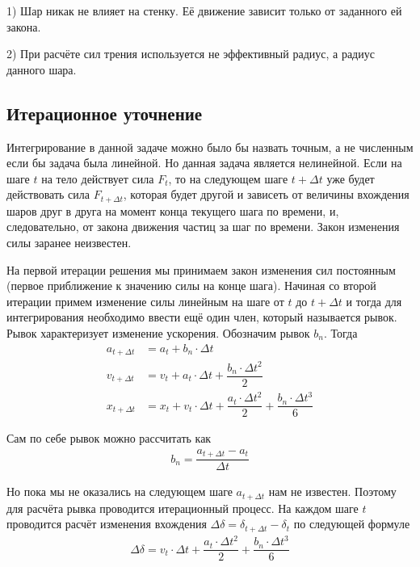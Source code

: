 \documentclass[a4paper]{article}
\begin{document}
1) Шар никак не влияет на стенку. 
Её движение зависит только от заданного ей закона.

2) При расчёте сил трения используется не эффективный радиус, а радиус данного шара.


 
\subsection{Итерационное уточнение}
\label{iter_subsection}


Интегрирование в данной задаче можно было бы назвать точным, а не численным если бы задача была линейной.
Но данная задача является нелинейной. Если на шаге $t$ на тело действует сила $F_t$, то на следующем шаге $t + \Delta t$ уже будет действовать сила $F_{t + \Delta t}$, которая будет другой и зависеть от величины вхождения шаров друг в друга на момент конца текущего шага по времени, и, следовательно, от закона движения частиц за шаг по времени. 
Закон изменения силы заранее неизвестен.

На первой итерации решения мы принимаем закон изменения сил постоянным (первое приближение к значению силы на конце шага).
Начиная со второй итерации примем изменение силы линейным на шаге от $t$ до $t + \Delta t$  и тогда для интегрирования необходимо ввести ещё один член, который называется рывок. 
Рывок характеризует изменение ускорения.
Обозначим рывок $b_n$.
Тогда
\begin{align*}
a_{t + \Delta t} &= a_t + b_n \cdot \Delta t \\
v_{t + \Delta t} &= v_t + a_t \cdot \Delta t + \dfrac{b_n \cdot \Delta t^2}{2} \\
x_{t + \Delta t} &= x_t + v_t \cdot \Delta t + \dfrac{a_t \cdot \Delta t^2}{2} +  \dfrac{b_n \cdot \Delta t^3}{6}
\end{align*}

Сам по себе рывок можно рассчитать как
\begin{align}
\label{jerk_normal}
b_n = \dfrac{a_{t + \Delta t} - a_{t}}{\Delta t}
\end{align}

Но пока мы не оказались на следующем шаге $a_{t + \Delta t}$ нам не известен.
Поэтому для расчёта рывка проводится итерационный процесс. 
На каждом шаге $t$ проводится расчёт изменения вхождения $\Delta \delta = \delta_{t + \Delta t} - \delta_t$ по следующей формуле
\begin{align*}
\Delta \delta = v_t \cdot \Delta t + \dfrac{a_t \cdot \Delta t^2}{2} +  \dfrac{b_n \cdot \Delta t^3}{6}
\end{align*}
\end{document}
